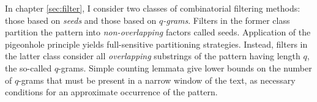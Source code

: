 In chapter \ref{sec:filter}, I consider two classes of combinatorial filtering methods: those based on \emph{seeds} and those based on \emph{$q$-grams}.
Filters in the former class partition the pattern into \emph{non-overlapping} factors called seeds.
Application of the pigeonhole principle yields full-sensitive partitioning strategies.
Instead, filters in the latter class consider all \emph{overlapping} substrings of the pattern having length $q$, the so-called $q$-grams.
Simple counting lemmata give lower bounds on the number of $q$-grams that must be present in a narrow window of the text, as necessary conditions for an approximate occurrence of the pattern.
